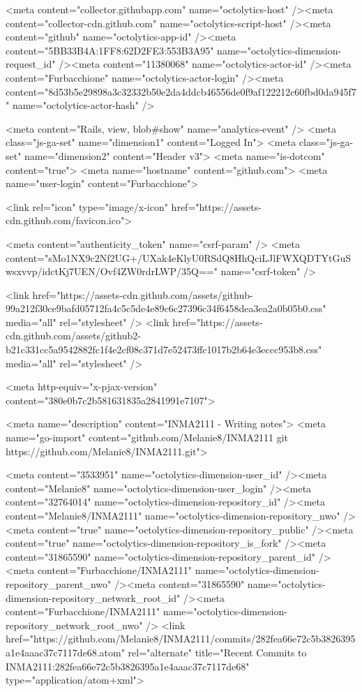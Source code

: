     <meta content="collector.githubapp.com" name="octolytics-host" /><meta content="collector-cdn.github.com" name="octolytics-script-host" /><meta content="github" name="octolytics-app-id" /><meta content="5BB33B4A:1FF8:62D2FE3:553B3A95" name="octolytics-dimension-request_id" /><meta content="11380068" name="octolytics-actor-id" /><meta content="Furbacchione" name="octolytics-actor-login" /><meta content="8d53b5e29898a3c32332b50e2da4ddcb46556de0f9af122212c60fbd0da945f7" name="octolytics-actor-hash" />
    
    <meta content="Rails, view, blob#show" name="analytics-event" />
    <meta class="js-ga-set" name="dimension1" content="Logged In">
    <meta class="js-ga-set" name="dimension2" content="Header v3">
    <meta name="is-dotcom" content="true">
    <meta name="hostname" content="github.com">
    <meta name="user-login" content="Furbacchione">

    
    <link rel="icon" type="image/x-icon" href="https://assets-cdn.github.com/favicon.ico">


    <meta content="authenticity_token" name="csrf-param" />
<meta content="sMo1NX9c2Nf2UG+/UXak4eKlyU0RSdQ8HhQciLJlFWXQDTYtGuSwsxvvp/idctKj7UEN/Ovf4ZW0rdrLWP/35Q==" name="csrf-token" />

    <link href="https://assets-cdn.github.com/assets/github-99a212f30ce9bafd05712fa4c5c5de4e89c6c27396c34f6458dea3ea2a0b05b0.css" media="all" rel="stylesheet" />
    <link href="https://assets-cdn.github.com/assets/github2-b21c331cc5a9542882fc1f4e2cf08c371d7e52473ffc1017b2b64e3eccc953b8.css" media="all" rel="stylesheet" />
    
    


    <meta http-equiv="x-pjax-version" content="380e0b7c2b581631835a2841991e7107">

      
  <meta name="description" content="INMA2111 - Writing notes">
  <meta name="go-import" content="github.com/Melanie8/INMA2111 git https://github.com/Melanie8/INMA2111.git">

  <meta content="3533951" name="octolytics-dimension-user_id" /><meta content="Melanie8" name="octolytics-dimension-user_login" /><meta content="32764014" name="octolytics-dimension-repository_id" /><meta content="Melanie8/INMA2111" name="octolytics-dimension-repository_nwo" /><meta content="true" name="octolytics-dimension-repository_public" /><meta content="true" name="octolytics-dimension-repository_is_fork" /><meta content="31865590" name="octolytics-dimension-repository_parent_id" /><meta content="Furbacchione/INMA2111" name="octolytics-dimension-repository_parent_nwo" /><meta content="31865590" name="octolytics-dimension-repository_network_root_id" /><meta content="Furbacchione/INMA2111" name="octolytics-dimension-repository_network_root_nwo" />
  <link href="https://github.com/Melanie8/INMA2111/commits/282fea66e72c5b3826395a1e4aaac37c7117de68.atom" rel="alternate" title="Recent Commits to INMA2111:282fea66e72c5b3826395a1e4aaac37c7117de68" type="application/atom+xml">

